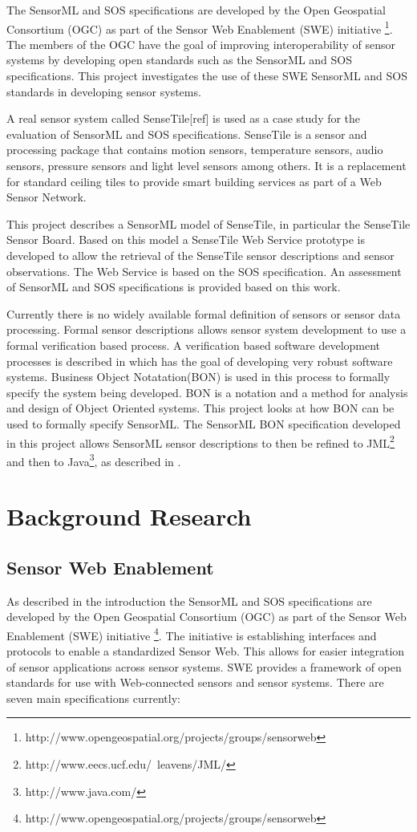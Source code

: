 \documentclass[]{final_report}
\begin{document}
The SensorML and SOS specifications are developed by the Open Geospatial Consortium (OGC) as part of the Sensor Web Enablement (SWE) initiative \footnote{http://www.opengeospatial.org/projects/groups/sensorweb}. The members of the OGC have the goal of improving interoperability of sensor systems by developing open standards such as the SensorML and SOS specifications. This project investigates the use of these SWE SensorML and SOS standards in developing sensor systems.

A real sensor system called SenseTile[ref] is used as a case study for the evaluation of SensorML and SOS specifications. SenseTile is a sensor and processing package that contains motion sensors, temperature sensors, audio sensors, pressure sensors and light level sensors among others. It is a replacement for standard ceiling tiles to provide smart building services as part of a Web Sensor Network.

This project describes a  SensorML model of SenseTile, in particular the SenseTile Sensor Board. Based on this model a SenseTile Web Service prototype is developed to allow the retrieval of the SenseTile sensor descriptions and sensor observations. The Web Service is based on the SOS specification. An assessment of SensorML and SOS specifications is provided based on this work.

Currently there is no widely available formal definition of sensors or sensor data processing. Formal sensor descriptions allows sensor system development to use a formal verification based process. A verification based software development processes is described in \cite{Kiniryref} which has the goal of developing very robust software systems. Business Object Notatation(BON)\cite{BONref} is used in this process to formally specify the system being developed. BON is a notation and a method for analysis and design of Object Oriented systems. This project looks at how BON can be used to formally specify SensorML. The SensorML BON specification developed in this project allows SensorML sensor descriptions to then be refined to JML\footnote{http://www.eecs.ucf.edu/~leavens/JML/} and then to Java\footnote{http://www.java.com/}, as described in \cite{Kiniryref}.


\chapter{ Background Research}

\section{Sensor Web Enablement}\label{SWESec}
As described in the introduction the SensorML and SOS specifications are developed by the Open Geospatial Consortium (OGC) as part of the Sensor Web Enablement (SWE) initiative \footnote{http://www.opengeospatial.org/projects/groups/sensorweb}. The initiative is establishing interfaces and protocols to enable a standardized Sensor Web. This allows for easier integration of sensor applications across sensor systems. SWE provides a framework of open standards for use with Web-connected sensors and sensor systems. There are seven main specifications currently:
\end{document}
